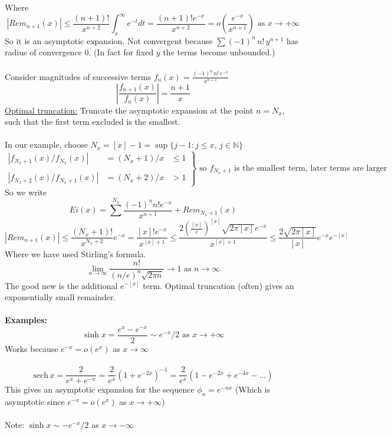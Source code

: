 \documentclass{article}
\newcommand{\examples}{\textbf{Examples:}}
\begin{document}
Where
\[ |Rem_{n+1}(x)| \leq \frac{(n+1)!}{x^{n+2}} \int_x^{\infty} e^{-t} dt =
\frac{(n+1)! e^{-x}}{x^{n+2}} = o\left( \frac{e^{-x}}{x^{n+1}} \right) 
\mbox{ as } x \to + \infty \]
So it is an asymptotic expansion. Not convergent because 
$\displaystyle \sum (-1)^n \,n! \, y^{n+1}$
has radius of convergence 0. (In fact for fixed $y$ the terms become unbounded.)
\\
\\
Consider magnitudes of successive terms $\displaystyle 
f_n(x) =\frac{ (-1)^n\, n!\, e^{-x}}{x^{n+1}}$
\[ \left| \frac{f_{n+1}(x)}{f_n(x)}\right| = \frac{n+1}{x} \]
\underline{Optimal truncation:} Truncate the asymptotic expansion at the 
point $n=N_x$, such that the first term excluded is the smallest.
\\
\\
In our example, choose $N_x = [x] -1 = \sup \{j-1: j \leq x, \, j\in \mathbb{N} \}$
\[ \left. \begin{array}{ccc}
\left| f_{N_x+1}(x)/f_{N_x}(x)\right| &= (N_x+1)/x &\leq 1 \\
\\
\left| f_{N_x+2}(x)/f_{N_x+1}(x)\right| &= (N_x+2)/x &> 1 \end{array}
\right\} \mbox{ so } f_{N_x+1} \mbox{ is the smallest term, later terms are larger} \]
So we write
\[ Ei(x) = \sum^{N_x} \frac{(-1)^n n! e^{-x}}{x^{n+1}} + Rem_{N_x+1}(x) \]
\[ |Rem_{n+1}(x)| \leq \frac{(N_x+1)!}{x^{N_x+2}}e^{-x} =
\frac{[x]! e^{-x}}{x^{[x]+1}} \leq
\frac{2 \left( \frac{[x]}{e} \right)^{[x]} \sqrt{2\pi [x]} e^{-x}}{x^{[x]+1}}
\leq \frac{2\sqrt{2\pi[x]}}{[x]} e^{-x} e^{-[x]} \]
Where we have used Stirling's formula. 
\[ \lim_{n \to \infty} \frac{n!}{(n/e)^n \sqrt{2\pi n}} \to 1 \mbox{ as } n \to \infty \]
The good new is the additional 
$e^{-[x]}$ term. Optimal truncation (often) gives an exponentially small 
remainder.
\\
\\
\examples\
\[ \sinh x = \frac{e^x - e^{-x}}{2} \sim e^{-x}/2 \mbox{ as } x \to + \infty \]
Works because $e^{-x} = o(e^x)$ as $x \to \infty$
\\
\\
\[ \mathrm{sech}  \, x = \frac{2}{e^x + e^{-x}} = \frac{2}{e^x}(1 + e^{-2x})^{-1} =
\frac{2}{e^x}(1 - e^{-2x} + e^{-4x} - \dots) \]
This gives an asymptotic expansion for the sequence $\phi_n = e^{-nx}$
(Which is asymptotic since $e^{-x} = o(e^x)$ as $x \to + \infty$)
\\
\\
Note: $\sinh x \sim -e^{-x}/2$ as $x \to -\infty$
\end{document}
